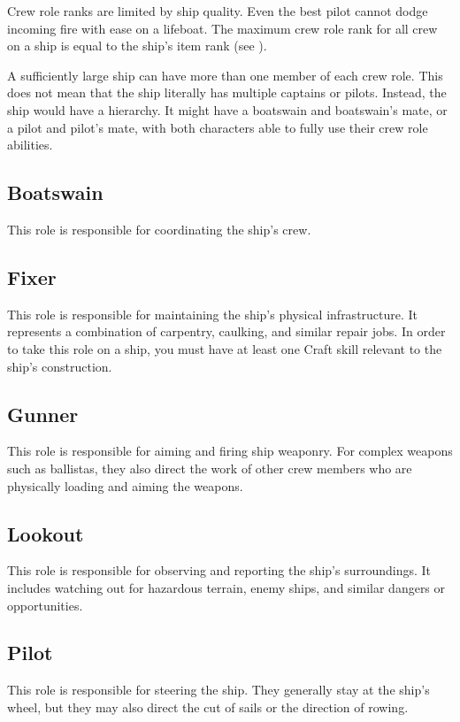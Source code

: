     Crew role ranks are limited by ship quality.
    Even the best pilot cannot dodge incoming fire with ease on a lifeboat.
    The maximum crew role rank for all crew on a ship is equal to the ship's item rank (see ).

    A sufficiently large ship can have more than one member of each crew role.
    This does not mean that the ship literally has multiple captains or pilots.
    Instead, the ship would have a hierarchy.
    It might have a boatswain and boatswain's mate, or a pilot and pilot's mate, with both characters able to fully use their crew role abilities.

    \subsection{Boatswain}
        This role is responsible for coordinating the ship's crew.

    \subsection{Fixer}
        This role is responsible for maintaining the ship's physical infrastructure.
        It represents a combination of carpentry, caulking, and similar repair jobs.
        In order to take this role on a ship, you must have at least one Craft skill relevant to the ship's construction.

    \subsection{Gunner}
        This role is responsible for aiming and firing ship weaponry.
        For complex weapons such as ballistas, they also direct the work of other crew members who are physically loading and aiming the weapons.

    \subsection{Lookout}
        This role is responsible for observing and reporting the ship's surroundings.
        It includes watching out for hazardous terrain, enemy ships, and similar dangers or opportunities.

    \subsection{Pilot}
        This role is responsible for steering the ship.
        They generally stay at the ship's wheel, but they may also direct the cut of sails or the direction of rowing.

